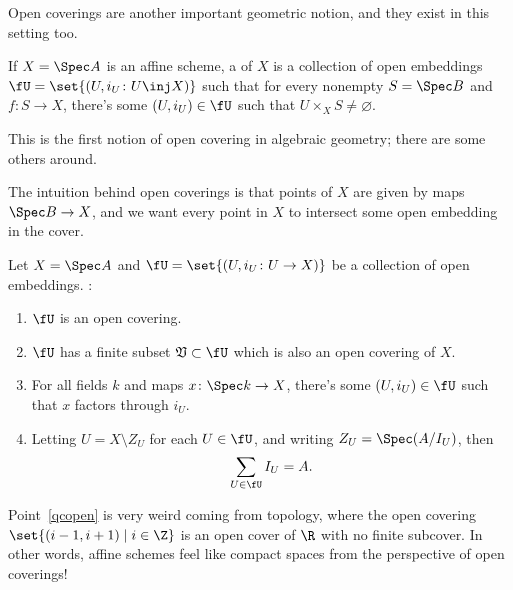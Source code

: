 Open coverings are another important geometric notion, and they exist in this setting too.
\begin{defn}
\label{zariskicover}
If $X = \Spec A$ is an affine scheme, a  of $X$ is a collection of open embeddings
$\fU = \set{(U, i_U\colon U\inj X)}$ such that for every nonempty $S = \Spec B$ and $f\colon S\to X$, there's some
$(U,i_U)\in\fU$ such that $U\times_X S\ne \varnothing$.
\end{defn}
This is the first notion of open covering in algebraic geometry; there are some others around.

The intuition behind open coverings is that points of $X$ are given by maps $\Spec B\to X$, and we want every point
in $X$ to intersect some open embedding in the cover.
\begin{prop}
\label{qc}
Let $X = \Spec A$ and $\fU = \set{(U, i_U\colon U\to X)}$ be a collection of open embeddings. \TFAE:
\begin{enumerate}
	\item\label{isopen} $\fU$ is an open covering.
	\item\label{qcopen} $\fU$ has a finite subset $\mathfrak V\subset\fU$ which is also an open covering of $X$.
	\item\label{speck} For all fields $k$ and maps $x\colon\Spec k\to X$, there's some $(U,i_U)\in\fU$ such that
	$x$ factors through $i_U$.
	\item\label{open_irl} Letting $U = X\setminus Z_U$ for each $U\in\fU$, and writing $Z_U = \Spec(A/I_U)$, then
	\[\sum_{U\in\fU} I_U = A.\]
\end{enumerate}
\end{prop}
Point~\eqref{qcopen} is very weird coming from topology, where the open covering $\set{(i-1,i+1)\mid i\in\Z}$ is an
open cover of $\R$ with no finite subcover. In other words, affine schemes feel like compact spaces from the
perspective of open coverings!

